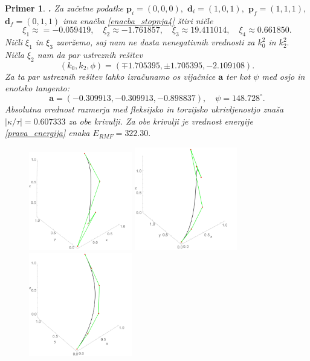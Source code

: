\documentclass[12pt,a4paper,twoside]{article}
\theoremstyle{definition} %
\theoremstyle{plain} %
\theoremstyle{primerstyle}
\newtheorem{primer}[definicija]{Primer}
\numberwithin{equation}{section}  %
\newcommand{\aV}{\mathbf{a}}
\newcommand{\dV}{\mathbf{d}}
\newcommand{\pV}{\mathbf{p}}
\begin{document}
\begin{primer}
	\textbf{. }Za začetne podatke $\pV_i=(0,0,0),$ $\dV_i=(1,0,1),$ $\pV_f=(1,1,1),$ $\dV_f=(0,1,1)$ ima enačba \eqref{enacba_stopnja4} štiri ničle
	\begin{equation}
		\label{hermit_nicle}
		\xi_1\approx=-0.059419,\quad\xi_2\approx-1.761857,\quad\xi_3\approx19.411014,\quad\xi_4\approx0.661850.
	\end{equation}
	Ničli $\xi_1$ in $\xi_3$ zavržemo, saj nam ne dasta nenegativnih vrednosti za $k_0^2$ in $k_2^2.$ Ničla $\xi_2$ nam da par ustreznih rešitev
	\begin{equation}
		\label{par_resitev1}
		(k_0,k_2,\phi)=(\mp1.705395,\pm1.705395,-2.109108).
	\end{equation}
	Za ta par ustreznih rešitev lahko izračunamo os vijačnice $\aV$ ter kot $\psi$ med osjo in enotsko tangento:
	\begin{equation}
		\label{par_resitev1_oskot}
		\aV=(-0.309913,-0.309913,-0.898837),\quad\psi=148.728^\circ.
	\end{equation}
	Absolutna vrednost razmerja med fleksijsko in torzijsko ukrivljenostjo znaša $|\kappa/\tau|=0.607333$ za obe krivulji. Za obe krivulji je vrednost energije \eqref{prava_energija} enaka $E_{RMF}=322.30.$
	\begin{figure}[h]
	  \centering
	  \includegraphics[width=0.4\textwidth]{images/hermit1.pdf}
	  \includegraphics[width=0.4\textwidth]{images/hermit2.pdf}
	  \includegraphics[width=0.4\textwidth]{images/hermit3.pdf}

\end{figure}
\end{primer}
\end{document}
